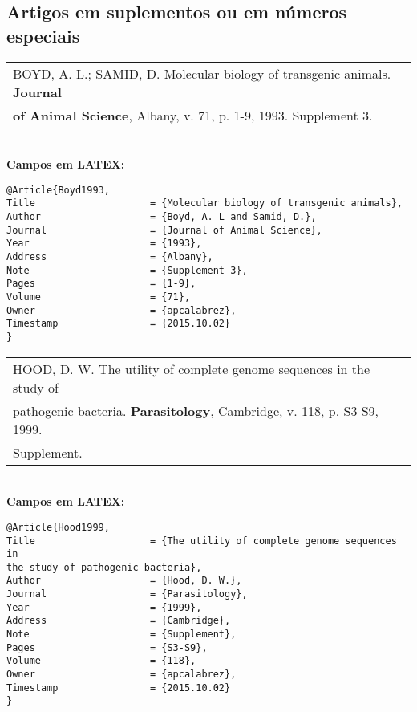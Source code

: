 \subsection{Artigos em suplementos ou em números especiais}

\begin{tabular}{|l|c|} \hline
	BOYD, A. L.; SAMID, D. Molecular biology of transgenic animals. \textbf{Journal } \\ \textbf{of Animal Science}, Albany, v. 71, p. 1-9, 1993. Supplement 3. 
	\\\hline
\end{tabular} \\

\textbf{Campos em LATEX:} 

\begin{verbatim}
@Article{Boyd1993,
Title                    = {Molecular biology of transgenic animals},
Author                   = {Boyd, A. L and Samid, D.},
Journal                  = {Journal of Animal Science},
Year                     = {1993},
Address                  = {Albany},
Note                     = {Supplement 3},
Pages                    = {1-9},
Volume                   = {71},
Owner                    = {apcalabrez},
Timestamp                = {2015.10.02}
}
\end{verbatim}

\begin{tabular}{|l|c|} \hline
	HOOD, D. W. The utility of complete genome sequences in the study of \\pathogenic bacteria. \textbf{Parasitology}, Cambridge, v. 118, p. S3-S9, 1999. \\Supplement. \\\hline
\end{tabular} \\

\textbf{Campos em LATEX:} 

\begin{verbatim}
@Article{Hood1999,
Title                    = {The utility of complete genome sequences in 
the study of pathogenic bacteria},
Author                   = {Hood, D. W.},
Journal                  = {Parasitology},
Year                     = {1999},
Address                  = {Cambridge},
Note                     = {Supplement},
Pages                    = {S3-S9},
Volume                   = {118},
Owner                    = {apcalabrez},
Timestamp                = {2015.10.02}
}
\end{verbatim}

